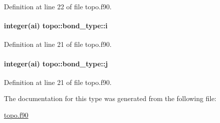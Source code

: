 Definition at line 22 of file topo.\-f90.

\hypertarget{structtopo_1_1bond__type_a9fb0e794b5bd24e3774b8d6963183d87}{
\paragraph[{i}]{\setlength{\rightskip}{0pt plus 5cm}integer(ai) topo\-::bond\-\_\-type\-::i}}\label{structtopo_1_1bond__type_a9fb0e794b5bd24e3774b8d6963183d87}


Definition at line 21 of file topo.\-f90.

\hypertarget{structtopo_1_1bond__type_a49cfa20c7f21fc0af62e369b98e1bb04}{
\paragraph[{j}]{\setlength{\rightskip}{0pt plus 5cm}integer(ai) topo\-::bond\-\_\-type\-::j}}\label{structtopo_1_1bond__type_a49cfa20c7f21fc0af62e369b98e1bb04}


Definition at line 21 of file topo.\-f90.



The documentation for this type was generated from the following file\-:\begin{DoxyCompactItemize}
\item 
\hyperlink{topo_8f90}{topo.\-f90}\end{DoxyCompactItemize}
